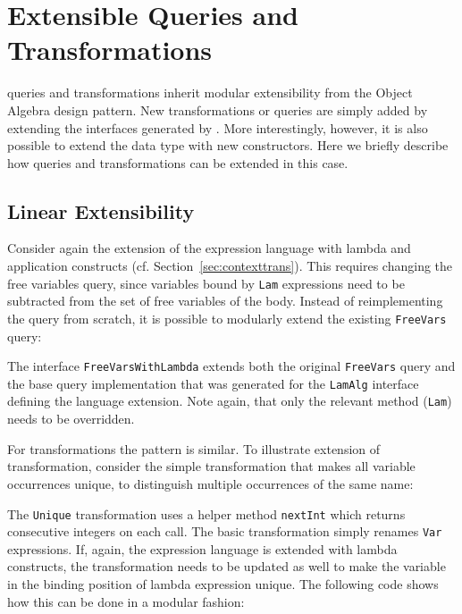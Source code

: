 

\section{Extensible Queries and Transformations}
\label{SECT:extensible}


\noindent \name queries and transformations inherit modular
extensibility from the Object Algebra design pattern.  New
transformations or queries are simply added by extending the
interfaces generated by \name.  More interestingly, however, it is
also possible to extend the data type with new constructors.  Here we
briefly describe how queries and transformations can be extended in
this case.

\subsection{Linear Extensibility}

Consider again the extension of the expression language with lambda
and application constructs (cf. Section~\ref{sec:contexttrans}).  This
requires changing the free variables query, since variables bound by
\lstinline{Lam} expressions need to be subtracted from the set of free
variables of the body.  Instead of reimplementing the query from
scratch, it is possible to modularly extend the existing
\lstinline{FreeVars} query:


The interface \lstinline{FreeVarsWithLambda} extends both the original \lstinline{FreeVars} query and the base query implementation that was generated for the \lstinline{LamAlg} interface defining the language extension.
Note again, that only the relevant method (\lstinline{Lam}) needs to be overridden.


For transformations the pattern is similar.
To illustrate extension of transformation, consider the simple transformation that makes all variable occurrences unique, to distinguish multiple occurrences of the same name:



The \lstinline{Unique} transformation uses a helper method \lstinline{nextInt} which returns consecutive integers on each call.
The basic transformation simply renames \lstinline{Var} expressions.
If, again, the expression language is extended with lambda constructs, the transformation needs to be updated as well to make the variable in the binding position of lambda expression unique.
The following code shows how this can be done in a modular fashion:

